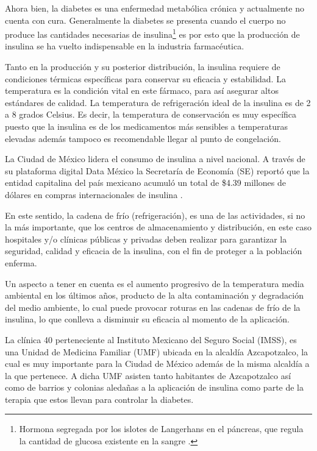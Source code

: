 Ahora bien, la diabetes es una enfermedad metabólica crónica y actualmente no cuenta con cura. Generalmente la diabetes se presenta cuando el cuerpo no produce las cantidades necesarias de insulina\footnote{Hormona segregada por los islotes de Langerhans en el páncreas, que regula la cantidad de glucosa existente en la sangre \cite{RAE23}.} es por esto que la producción de insulina se ha vuelto indispensable en la industria farmacéutica.

Tanto en la producción y su posterior distribución, la insulina requiere de condiciones térmicas específicas para conservar su eficacia y estabilidad. La temperatura es la condición vital en este fármaco, para así asegurar altos estándares de calidad. La temperatura de refrigeración ideal de la insulina es de 2 a 8 grados Celsius. Es decir, la temperatura de conservación es muy específica puesto que la insulina es de los medicamentos más sensibles a temperaturas elevadas además tampoco es recomendable llegar al punto de congelación.

La Ciudad de México lidera el consumo de insulina a nivel nacional. A través de su plataforma digital Data México la Secretaría de Economía (SE) reportó que la entidad capitalina del país mexicano acumuló un total de \$4.39 millones de dólares en compras internacionales de insulina \cite{datamex}.

En este sentido, la cadena de frío (refrigeración), es una de las actividades, si no la más importante, que los centros de almacenamiento y distribución, en este caso hospitales y/o clínicas públicas y privadas  deben realizar para garantizar la seguridad, calidad y eficacia de la insulina, con el fin de proteger a la población enferma.

Un aspecto a tener en cuenta es el aumento progresivo de la temperatura media ambiental en los últimos años,  producto de la alta contaminación y degradación del  medio ambiente, lo cual puede provocar roturas en las cadenas de frío de la insulina, lo que conlleva a disminuir su eficacia al momento de la aplicación. 

La clínica 40 perteneciente al Instituto Mexicano del Seguro Social (IMSS), es una Unidad de Medicina Familiar (UMF) ubicada en la alcaldía Azcapotzalco, la cual es muy importante para la Ciudad de México además de la misma alcaldía a la que pertenece. A dicha UMF asisten tanto habitantes de Azcapotzalco así como de barrios y colonias aledañas a la aplicación de insulina como parte de la terapia que estos llevan para controlar la diabetes.

